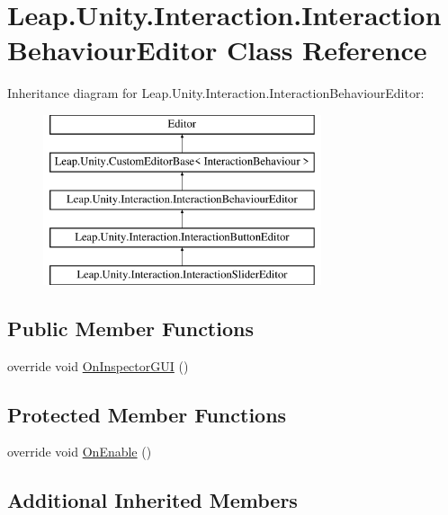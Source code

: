 \hypertarget{class_leap_1_1_unity_1_1_interaction_1_1_interaction_behaviour_editor}{}\section{Leap.\+Unity.\+Interaction.\+Interaction\+Behaviour\+Editor Class Reference}
\label{class_leap_1_1_unity_1_1_interaction_1_1_interaction_behaviour_editor}
Inheritance diagram for Leap.\+Unity.\+Interaction.\+Interaction\+Behaviour\+Editor\+:\begin{figure}[H]
\begin{center}
\leavevmode
\includegraphics[height=5.000000cm]{class_leap_1_1_unity_1_1_interaction_1_1_interaction_behaviour_editor}
\end{center}
\end{figure}
\subsection*{Public Member Functions}
\begin{DoxyCompactItemize}
\item 
override void \mbox{\hyperlink{class_leap_1_1_unity_1_1_interaction_1_1_interaction_behaviour_editor_afa4ad41f5b9616fca03ff68ad9835fa8}{On\+Inspector\+G\+UI}} ()
\end{DoxyCompactItemize}
\subsection*{Protected Member Functions}
\begin{DoxyCompactItemize}
\item 
override void \mbox{\hyperlink{class_leap_1_1_unity_1_1_interaction_1_1_interaction_behaviour_editor_ab79cc92b11713942f5e3453789317297}{On\+Enable}} ()
\end{DoxyCompactItemize}
\subsection*{Additional Inherited Members}


